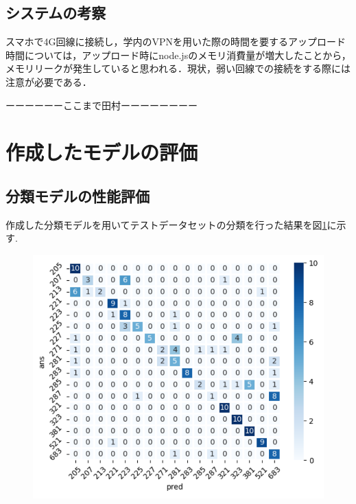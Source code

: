 \begin{multicols*}{2}
\subsection{システムの考察}
スマホで4G回線に接続し，学内のVPNを用いた際の時間を要するアップロード時間については，アップロード時にnode.jsのメモリ消費量が増大したことから，メモリリークが発生していると思われる．現状，弱い回線での接続をする際には注意が必要である．


ーーーーーーここまで田村ーーーーーーーー

\section{作成したモデルの評価}

\subsection{分類モデルの性能評価}
作成した分類モデルを用いてテストデータセットの分類を行った結果を図\ref{fig:classifyresults}に示す.
\begin{figure}
	\centering
	\includegraphics[width=\linewidth]{obj/classify_results.pdf}
	\label{fig:classifyresults}
\end{figure}


\end{multicols*}
